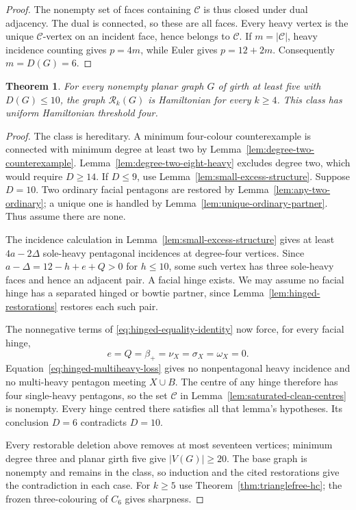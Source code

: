\documentclass[11pt]{article}
\newtheorem{theorem}{Theorem}[section]
\theoremstyle{remark}
\newcommand{\Rk}{\mathcal R_k}
\numberwithin{equation}{section}
\numberwithin{table}{section}
\begin{document}
\begin{proof}
The nonempty set of faces containing $\mathcal C$ is thus closed
under dual adjacency. The dual is connected, so these are all faces.
Every heavy vertex is the unique $\mathcal C$-vertex on an incident
face, hence belongs to $\mathcal C$. If $m=|\mathcal C|$, heavy
incidence counting gives $p=4m$, while Euler gives $p=12+2m$.
Consequently $m=D(G)=6$.
\end{proof}

\begin{theorem}\label{thm:excess-ten}
For every nonempty planar graph $G$ of girth at least five with
$D(G)\le10$, the graph $\Rk(G)$ is Hamiltonian for every $k\ge4$.
This class has uniform Hamiltonian threshold four.
\end{theorem}
\begin{proof}
The class is hereditary. A minimum four-colour counterexample is
connected with minimum degree at least two by
Lemma~\ref{lem:degree-two-counterexample}.
Lemma~\ref{lem:degree-two-eight-heavy} excludes degree two, which
would require $D\ge14$. If $D\le9$, use
Lemma~\ref{lem:small-excess-structure}. Suppose $D=10$.
Two ordinary facial pentagons are restored by
Lemma~\ref{lem:any-two-ordinary}; a unique one is handled by
Lemma~\ref{lem:unique-ordinary-partner}. Thus assume there are none.

The incidence calculation in Lemma~\ref{lem:small-excess-structure}
gives at least $4a-2\Delta$ sole-heavy pentagonal incidences at
degree-four vertices. Since $a-\Delta=12-h+e+Q>0$ for $h\le10$,
some such vertex has three sole-heavy faces and hence an adjacent
pair. A facial hinge exists. We may assume no facial hinge has a
separated hinged or bowtie partner, since
Lemma~\ref{lem:hinged-restorations} restores each such pair.

The nonnegative terms of \eqref{eq:hinged-equality-identity} now force,
for every facial hinge,
\[
 e=Q=\beta_+=\nu_X=\sigma_X=\omega_X=0.
\]
Equation~\eqref{eq:hinged-multiheavy-loss} gives no nonpentagonal
heavy incidence and no multi-heavy pentagon meeting $X\cup B$.
The centre of any hinge therefore has four single-heavy pentagons,
so the set $\mathcal C$ in Lemma~\ref{lem:saturated-clean-centres}
is nonempty. Every hinge centred there satisfies all that lemma's
hypotheses. Its conclusion $D=6$ contradicts $D=10$.

Every restorable deletion above removes at most seventeen vertices;
minimum degree three and planar girth five give $|V(G)|\ge20$.
The base graph is nonempty and remains in the class, so induction
and the cited restorations give the contradiction in each case.
For $k\ge5$ use Theorem~\ref{thm:trianglefree-hc}; the frozen
three-colouring of $C_6$ gives sharpness.
\end{proof}
\end{document}
